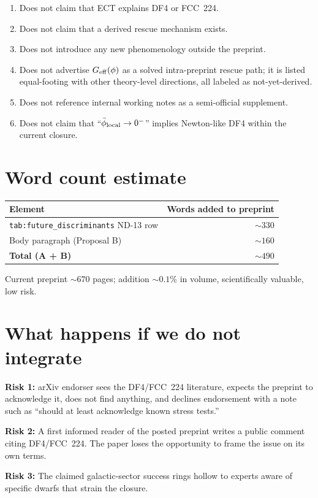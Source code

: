 \documentclass[11pt]{article}
\begin{document}
\begin{enumerate}
\item Does not claim that ECT explains DF4 or FCC~224.
\item Does not claim that a derived rescue mechanism exists.
\item Does not introduce any new phenomenology outside the preprint.
\item Does not advertise $G_{\rm eff}(\phi)$ as a solved intra-preprint
rescue path; it is listed equal-footing with other theory-level
directions, all labeled as not-yet-derived.
\item Does not reference internal working notes as a semi-official
supplement.
\item Does not claim that ``$\bar\phi_{\rm local}\to 0^-$'' implies
Newton-like DF4 within the current closure.
\end{enumerate}

\section{Word count estimate}

\begin{tabular}{lr}
\toprule
Element & Words added to preprint\\
\midrule
{\tt tab:future\_discriminants} ND-13 row & $\sim 330$\\
Body paragraph (Proposal B) & $\sim 160$\\
\midrule
\textbf{Total (A + B)} & $\sim 490$\\
\bottomrule
\end{tabular}

Current preprint $\sim 670$ pages; addition $\sim 0.1\%$ in volume,
scientifically valuable, low risk.

\section{What happens if we do not integrate}

\textbf{Risk 1:} arXiv endorser sees the DF4/FCC~224 literature, expects
the preprint to acknowledge it, does not find anything, and declines
endorsement with a note such as ``should at least acknowledge known
stress tests.''

\textbf{Risk 2:} A first informed reader of the posted preprint writes
a public comment citing DF4/FCC~224. The paper loses the opportunity
to frame the issue on its own terms.

\textbf{Risk 3:} The claimed galactic-sector success rings hollow to
experts aware of specific dwarfs that strain the closure.
\end{document}
